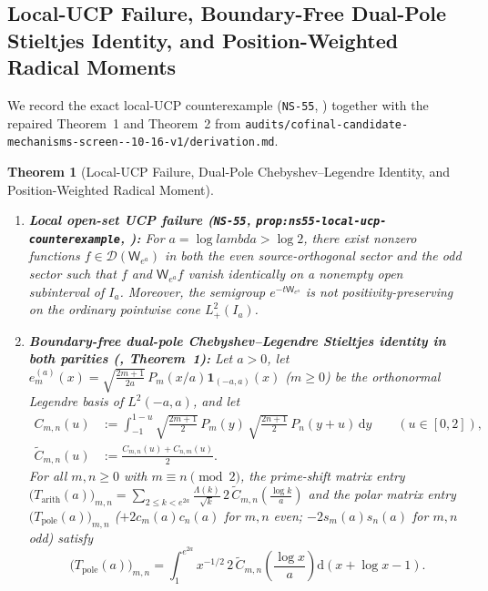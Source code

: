 \documentclass[11pt]{article}
\def\lambda{lambda}%
\newtheorem{theorem}{Theorem}[section]
\theoremstyle{remark}
\newcommand{\dd}{\mathrm d}
\begin{document}
\subsection{Local-UCP Failure, Boundary-Free Dual-Pole Stieltjes Identity, and Position-Weighted Radical Moments}
We record the exact local-UCP counterexample (\texttt{NS-55}, ) together with the repaired Theorem~1 and Theorem~2 from \texttt{audits/cofinal-\allowbreak candidate-\allowbreak mechanisms-\allowbreak screen--10-16-v1/\allowbreak derivation.md}.

\begin{theorem}[Local-UCP Failure, Dual-Pole Chebyshev--Legendre Identity, and Position-Weighted Radical Moment]
\label{thm:ucp-and-dual-pole}
\leavevmode
\begin{enumerate}[label=(\alph*)]
  \item \textbf{Local open-set UCP failure (\texttt{NS-55}, \texttt{prop:ns55-\allowbreak local-\allowbreak ucp-\allowbreak counterexample}, ):} For $a = \log\lambda > \log 2$, there exist nonzero functions $f \in \mathcal{D}(\mathsf{W}_{e^a})$ in both the even source-orthogonal sector and the odd sector such that $f$ and $\mathsf{W}_{e^a} f$ vanish identically on a nonempty open subinterval of $I_a$. Moreover, the semigroup $e^{-t\mathsf{W}_{e^a}}$ is not positivity-preserving on the ordinary pointwise cone $L^2_+(I_a)$.
  \item \textbf{Boundary-free dual-pole Chebyshev--Legendre Stieltjes identity in both parities (, Theorem~1):} Let $a > 0$, let $e_m^{(a)}(x) = \sqrt{\frac{2m+1}{2a}}\,P_m(x/a)\mathbf{1}_{(-a,a)}(x)$ ($m \ge 0$) be the orthonormal Legendre basis of $L^2(-a,a)$, and let
  \begin{align*}
    C_{m,n}(u) &:= \int_{-1}^{1-u} \sqrt{\frac{2m+1}{2}}\,P_m(y)\,\sqrt{\frac{2n+1}{2}}\,P_n(y+u)\,\dd y \qquad (u \in [0,2]), \\
    \widetilde{C}_{m,n}(u) &:= \frac{C_{m,n}(u) + C_{n,m}(u)}{2}.
  \end{align*}
  For all $m, n \ge 0$ with $m \equiv n \pmod 2$, the prime-shift matrix entry $\bigl(T_{\mathrm{arith}}(a)\bigr)_{m,n} = \sum_{2 \le k < e^{2a}} \frac{\Lambda(k)}{\sqrt{k}}\,2\,\widetilde{C}_{m,n}(\frac{\log k}{a})$ and the polar matrix entry $\bigl(T_{\mathrm{pole}}(a)\bigr)_{m,n}$ ($+2c_m(a)c_n(a)$ for $m,n$ even; $-2s_m(a)s_n(a)$ for $m,n$ odd) satisfy
  \begin{equation}\label{eq:dual-pole-stieltjes}
    \bigl(T_{\mathrm{pole}}(a)\bigr)_{m,n} = \int_1^{e^{2a}} x^{-1/2}\,2\,\widetilde{C}_{m,n}\!\left(\frac{\log x}{a}\right)\dd(x + \log x - 1).

\end{equation}
\end{enumerate}
\end{theorem}
\end{document}
